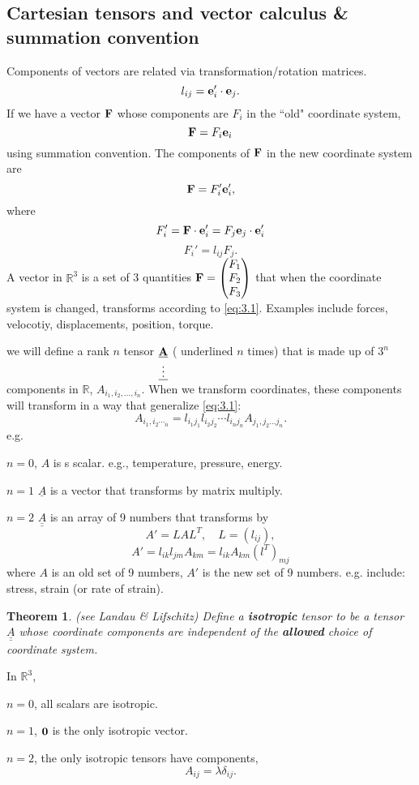\documentclass[12pt]{article}
\newtheorem{theorem}{Theorem}[section]
\newcommand{\ee}{{\bf e}}
\newcommand{\FF}{{\bf F}}
\newcommand{\bA}{{\bf A}}
\newcommand{\RR}{{\mathbb R}}
\newcommand{\mx}[1]{\begin{pmatrix}#1\end{pmatrix}}
\begin{document}
\subsection{Cartesian tensors and vector calculus \& summation convention}
 Components of vectors are related via transformation/rotation matrices.
\[
l_{ij} = \ee_i'\cdot\ee_j.
\]
If we have a vector $\FF$ whose components are $F_i$ in the ``old" coordinate system,
\[
\FF = F_i\ee_i
\]
using summation convention. The components of $\FF$ in the new coordinate system are
\[
\FF = F_i'\ee_i',
\]
where 
\[
F_i' = \FF\cdot\ee_i'= F_j\ee_j\cdot\ee_i'
\]
\begin{equation}\label{eq:3.1}
F_i' = l_{ij} F_j.
\end{equation}
A vector in $\RR^3$ is a set of 3 quantities $\FF = \mx{F_1\\F_2\\F_3}$ that when the coordinate system is changed, transforms according to \ref{eq:3.1}. Examples include forces, velocotiy, displacements, position, torque.

we will define a rank $n$ tensor $\underline{\underset{\vdots}{\underline\bA}}$ ( underlined $n$ times) that is made up of $3^n$ components in $\RR$, $A_{i_1, i_2, \dots,  i_n}$. When we transform coordinates, these components will transform in a way that generalize \ref{eq:3.1}:
\[
A_{i_1, i_2\dotsi_n} = l_{i_1j_1} l_{i_2j_2} \cdots l_{i_nj_n}A_{j_1, j_2\dots j_n}.
\]
e.g. 

$n=0$, $A$ is s scalar. e.g., temperature, pressure, energy.

$n=1$ $\underline A$ is a vector that transforms by matrix multiply.

$n=2$ $\underline{\underline A}$ is an array of 9 numbers that transforms by 
\[
A' = LAL^T, \quad L = (l_{ij}),
\]
\[
A' = l_{ik} l_{jm} A_{km} =  l_{ik} A_{km} (l^T)_{mj} 
\]
where $A$ is an old set of 9 numbers, $A'$ is the new set of 9 numbers. e.g. include: stress, strain (or rate of strain).

\begin{theorem} (see Landau \& Lifschitz)
Define a {\bf isotropic} tensor to be a tensor $\underline{\underline A}$ whose coordinate components are independent of the {\bf allowed} choice of coordinate system.
\end{theorem}
In $\RR^3$,

$n=0$, all scalars are isotropic.

$n=1$, $\bf 0$ is the only isotropic vector.

$n=2$, the only isotropic tensors have components, 
\[
A_{ij} = \lambda \delta_{ij}.
\]
\end{document}
